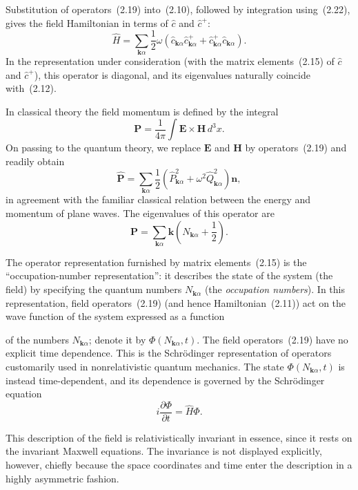 Substitution of operators~(2.19) into~(2.10), followed by integration using~(2.22), gives the field Hamiltonian in terms of $\widehat{c}$ and $\widehat{c}^{+}$:
\begin{equation}
\widehat{H}=\sum_{\mathbf{k}\alpha}\frac{1}{2}\omega\left(\widehat{c}_{\mathbf{k}\alpha}\widehat{c}_{\mathbf{k}\alpha}^{+}+\widehat{c}_{\mathbf{k}\alpha}^{+}\widehat{c}_{\mathbf{k}\alpha}\right).
\tag{2.23}
\end{equation}
In the representation under consideration (with the matrix elements~(2.15) of $\widehat{c}$ and $\widehat{c}^{+}$), this operator is diagonal, and its eigenvalues naturally coincide with~(2.12).

In classical theory the field momentum is defined by the integral
\[
\mathbf{P}=\frac{1}{4\pi}\int\mathbf{E}\times\mathbf{H}\,d^3x.
\]
On passing to the quantum theory, we replace $\mathbf{E}$ and $\mathbf{H}$ by operators~(2.19) and readily obtain
\begin{equation}
\widehat{\mathbf{P}}=\sum_{\mathbf{k}\alpha}\frac{1}{2}\left(\widehat{P}_{\mathbf{k}\alpha}^{2}+\omega^2\widehat{Q}_{\mathbf{k}\alpha}^{2}\right)\mathbf{n},
\tag{2.24}
\end{equation}
in agreement with the familiar classical relation between the energy and momentum of plane waves. The eigenvalues of this operator are
\begin{equation}
\mathbf{P}=\sum_{\mathbf{k}\alpha}\mathbf{k}\left(N_{\mathbf{k}\alpha}+\frac{1}{2}\right).
\tag{2.25}
\end{equation}

The operator representation furnished by matrix elements~(2.15) is the ``occupation-number representation'': it describes the state of the system (the field) by specifying the quantum numbers $N_{\mathbf{k}\alpha}$ (the \emph{occupation numbers}). In this representation, field operators~(2.19) (and hence Hamiltonian~(2.11)) act on the wave function of the system expressed as a function

of the numbers $N_{\mathbf{k}\alpha}$; denote it by $\Phi(N_{\mathbf{k}\alpha},t)$. The field operators~(2.19) have no explicit time dependence. This is the Schrödinger representation of operators customarily used in nonrelativistic quantum mechanics. The state $\Phi(N_{\mathbf{k}\alpha},t)$ is instead time-dependent, and its dependence is governed by the Schrödinger equation
\[
i\frac{\partial\Phi}{\partial t}=\widehat{H}\Phi.
\]

This description of the field is relativistically invariant in essence, since it rests on the invariant Maxwell equations. The invariance is not displayed explicitly, however, chiefly because the space coordinates and time enter the description in a highly asymmetric fashion.

